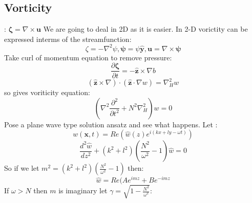 \documentclass{article}
\begin{document}
\subsection{Vorticity}: $\bm \zeta = \nabla \times \bm u$
We are going to deal in 2D as it is easier. In 2-D vorictity can be expressed interms of the streamfunction:
$$
\zeta = - \nabla^2 \psi, \bm \psi = \psi \hat{\bm y}, \bm u = \nabla \times \bm \psi
$$
Take curl of momentum equation to remove pressure:
$$
\frac{\partial \bm \zeta}{\partial t} = - \hat{\bm z} \times \nabla b
$$
$$
(\hat{\bm z} \times \nabla) \cdot (\hat{\bm z} \cdot \nabla w) = \nabla^2_H w
$$
so gives voriticity equation:
\begin{equation}
        (\nabla^2 \frac{\partial^2}{\partial t^2} + N^2 \nabla^2_H) w = 0
\end{equation}
Pose a plane wave type solution ansatz and see what happens. Let :
$$
w(\bm x, t) = Re( \hat w(z) e^{i(kx + ly - \omega t)})
$$
$$
\frac{d^2 \hat w}{dz^2} + (k^2 + l^2) (\frac{N^2}{\omega^2} -1) \hat w = 0
$$
So if we let $m^2 = (k^2 + l^2) ( \frac{N^2}{\omega^2}-1)$ then:
$$
\hat w = Re( A e^{imz} + Be^{-imz}
$$
If $\omega > N$ then $m$ is imaginary let $\gamma = \sqrt{1- \frac{N^2}{\omega^2}}$:
\end{document}
